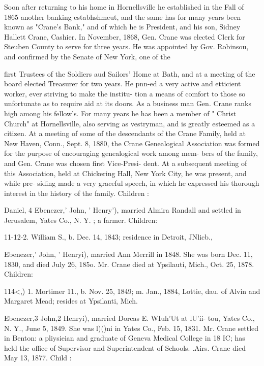 \documentclass{book}
\begin{document}
Soon after returning to his home in Hornellsville he established 
in the Fall of 1865 another banking estabhshmeut, and the same 
has for many years been known as "Crane's Bank," and of 
which he is President, and his son, Sidney Hallett Crane, Cashier. 
In November, 1868, Gen. Crane was elected Clerk for Steuben 
County to serve for three years. He was appointed by Gov. 
Robinsou, and confirmed by the Senate of New York, one of the 




first Trustees of the Soldiers aud Sailors' Home at Bath, and at a 
meeting of the board elected Treasurer for two years. He pnn-ed 
a very active and etticient worker, ever striving to make the institu- 
tion a means of comfort to those so unfortunate as to require aid 
at its doors. As a business man Gen. Crane ranks high among 
his fellow's. For many years he has been a member of " Christ 
Church" at Hornellsville, also serving as vestryman, and is 
greatly esteemed as a citizen. At a meeting of some of the 
descendants of the Crane Family, held at New Haven, Conn., 
Sept. 8, 1880, the Crane Genealogical Association was formed 
for the purpose of encouraging genealogical work among mem- 
bers of the family, and Gen. Crane was chosen first Vice-Presi- 
dent. At a subsequent meeting of this Association, held at 
Chickering Hall, New York City, he was present, and while pre- 
siding made a very graceful speech, in which he expressed his 
thorough interest in the history of the family. Children : 


Daniel, 4 Ebenezer,' John, ' Henry'), married Almira Randall and 
settled in Jerusalem, Yates Co., N. Y. ; a farmer. Children: 


11-12-2. William S., b. Dec. 14, 1843; residence in Detroit, JNlicb., 







Ebenezer,' John, ' Henryi), married Ann Merrill in 1848. She 
was born Dec. 11, 1830, and died July 26, 185o. Mr. Crane 
died at Ypsilauti, Mich., Oct. 25, 1878. Children: 

114<,) 1. Mortimer 11., b. Nov. 25, 1849; m. Jan., 1884, Lottie, dau. 
of Alvin and Margaret Mead; resides at Ypsilanti, Mich. 

Ebenezer,3 John,2 Henryi), married Dorcas E. WIuh'Ut at lU'ii- 
tou, Yates Co., N. Y., June 5, 1849. She was l)()ni in Yates 
Co., Feb. 15, 1831. Mr. Crane settled in Benton: a pliysieian 
and graduate of Geneva Medical College in 18 IC; has held the 
office of Supervisor and Superintendent of Schools. .Airs. Crane 
died May 13, 1877. Child : 
\end{document}
